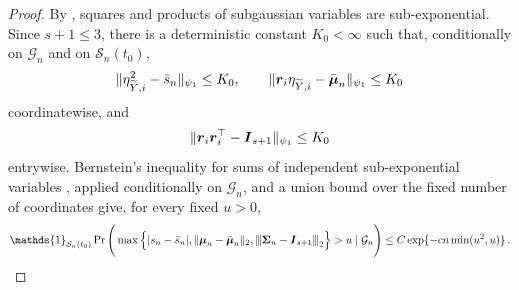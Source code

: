 \documentclass{article}
\makeatletter
\theoremstyle{definition}
\newcommand{\vnorm}[1]{%
	\ensuremath{%
		\if@display
		\left\| #1 \right\|
		\else
		\| #1 \|
		\fi
	}%
}
\newcommand{\abs}[1]{%
	\ensuremath{%
		\if@display
		\left| #1 \right|
		\else
		\lvert #1 \rvert
		\fi
	}%
}
\newcommand{\mnorm}[1]{{\left\vert\kern-0.25ex\left\vert\kern-0.25ex\left\vert #1
		\right\vert\kern-0.25ex\right\vert\kern-0.25ex\right\vert}}
\newcommand*{\bb}{\boldsymbol}
\def\bmu{\bb{\mu}}
\def\Ytil{\widetilde{Y}}
\def\bSigma{\bb{\Sigma}}
\makeatother
\begin{document}
\begin{bibunit}
\begin{proof}
By \citealt[][Lemmas~2.7.6 and~2.7.7]{vershynin:2018}, squares and
products of subgaussian variables are sub-exponential. Since
$s+1\leq3$, there is a deterministic constant $K_0<\infty$ such that,
conditionally on $\mathcal G_n$ and on $\mathcal S_n(t_0)$,
$$
	\vnorm{\eta_{\Ytil,i}^2-\bar s_n}_{\psi_1}
	\leq
	K_0,
	\qquad
	\vnorm{\bb r_i\eta_{\Ytil,i}-\bar{\bmu}_n}_{\psi_1}
	\leq
	K_0
$$
coordinatewise, and
$$
	\vnorm{\bb r_i\bb r_i^\top-\bb I_{s+1}}_{\psi_1}
	\leq
	K_0
$$
entrywise. Bernstein's inequality for sums of independent sub-exponential variables
\citep[Theorem~2.8.1]{vershynin:2018}, applied conditionally on
$\mathcal G_n$, and a union bound over the fixed number of coordinates give,
for every fixed $u>0$,
\begin{equation}
\label{eq:small_r_moment_concentration}
\begin{aligned}
	\mathds{1}_{\mathcal S_n(t_0)}
	\Pr\Bigg(
		\max\Big\{
			\abs{s_n-\bar s_n},
			\vnorm{\bmu_n-\bar{\bmu}_n}_2,
			\mnorm{\bSigma_n-\bb I_{s+1}}_2
		\Big\}
		>u
		\mid
		\mathcal G_n
	\Bigg)
	\leq
	C\exp\{-cn\min(u^2,u)\}\,.
\end{aligned}
\end{equation}


\end{proof}
\end{bibunit}
\end{document}
